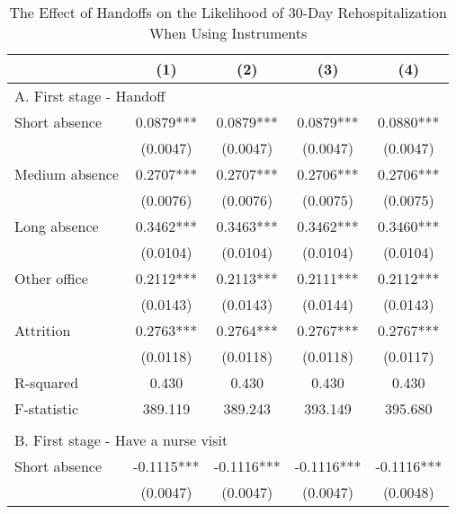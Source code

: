 \documentclass[final,12pt, notitlepage]{article}
\begin{document}
\begin{singlespace}
\newpage
\begin{table}[H]
\footnotesize
\setlength\tabcolsep{0pt}
\centering
\caption{The Effect of Handoffs on the Likelihood of 30-Day Rehospitalization When Using Instruments}
\label{tab:iv30}
\begin{threeparttable}
{
\def\sym#1{\ifmmode^{#1}\else\(^{#1}\)\fi}
\begin{tabular*}{\textwidth}{l@{\extracolsep{\fill}}*{4}{c}}
\toprule
                    &\multicolumn{1}{c}{(1)}&\multicolumn{1}{c}{(2)}&\multicolumn{1}{c}{(3)}&\multicolumn{1}{c}{(4)}\\
\midrule
\multicolumn{5}{l}{A. First stage - Handoff} \\
Short absence       &      0.0879***&      0.0879***&      0.0879***&      0.0880***\\
                    &    (0.0047)   &    (0.0047)   &    (0.0047)   &    (0.0047)   \\
Medium absence      &      0.2707***&      0.2707***&      0.2706***&      0.2706***\\
                    &    (0.0076)   &    (0.0076)   &    (0.0075)   &    (0.0075)   \\
Long absence        &      0.3462***&      0.3463***&      0.3462***&      0.3460***\\
                    &    (0.0104)   &    (0.0104)   &    (0.0104)   &    (0.0104)   \\
Other office        &      0.2112***&      0.2113***&      0.2111***&      0.2112***\\
                    &    (0.0143)   &    (0.0143)   &    (0.0144)   &    (0.0143)   \\
Attrition           &      0.2763***&      0.2764***&      0.2767***&      0.2767***\\
                    &    (0.0118)   &    (0.0118)   &    (0.0118)   &    (0.0117)   \\
R-squared           &      0.430   &      0.430   &      0.430   &      0.430   \\
F-statistic         &    389.119   &    389.243   &    393.149   &    395.680   \\
\\
\multicolumn{5}{l}{B. First stage - Have a nurse visit} \\
Short absence       &     -0.1115***&     -0.1116***&     -0.1116***&     -0.1116***\\
                    &    (0.0047)   &    (0.0047)   &    (0.0047)   &    (0.0048)   \\

\end{tabular*}}
\end{threeparttable}
\end{table}
\end{singlespace}
\end{document}
